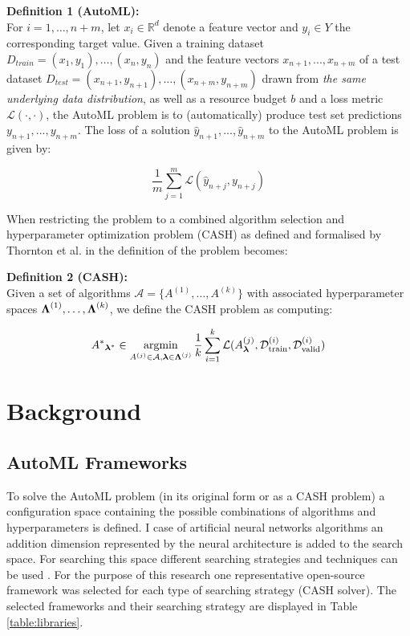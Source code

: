 \documentclass{sig-alternate-br}
\begin{document}
\textbf{Definition 1 (AutoML):} 
\\ For $i = 1, \dots , n + m$, let $x_i \in \mathbb{R}^d$ denote a feature vector and $y_i \in Y$ the corresponding target value. Given a training dataset $D_{train} = {(x_1, y_1),\dots , (x_{n}, y_{n})}$ and
the feature vectors $x_{n+1}, . . . , x_{n+m}$ of a test dataset $D_{test} = {(x_{n+1}, y_{n+1}), \dots ,(x_{n+m}, y_{n+m})}$
drawn from \textit{the same underlying data distribution}, as well as a resource budget $b$ and a loss metric
$\mathcal{L}(\cdot, \cdot)$, the AutoML problem is to (automatically) produce test set predictions $y_{n+1}, . . . , y_{n+m}$. The
loss of a solution $\hat{y}_{n+1}, . . . , \hat{y}_{n+m}$ to the AutoML problem is given by:

\begin{equation}
   \frac{1}{m} \sum_{j=1}^{m} \mathcal{L}( \hat{y}_{n+j},  {y}_{n+j})
\end{equation}

When restricting the problem to a combined algorithm selection and hyperparameter optimization problem (CASH) as defined and formalised by Thornton et al. in \cite{thornton2013autoweka} the definition of the problem becomes:

\textbf{Definition 2 (CASH):}
\\ Given a set of algorithms $\mathcal{A} = \{A^{(1)}, \dots, A^{(k)}\}$ with associated hyperparameter spaces ${\boldsymbol{\Lambda}}^{(1)}, \dots, {\boldsymbol{\Lambda}}^{(k)}$, we define
the CASH problem as computing:

\begin{equation}
{A^*}_{\vlambda^*} \in \argmin_{A^{(j)} \in \mathcal{A}, \vlambda \in \vLambda^{(j)}} \frac{1}{k}  \sum_{i=1}^{k} \mathcal{L}(A^{(j)}_\vlambda, \mathcal{D}_{\text{train}}^{(i)}, \mathcal{D}_{\text{valid}}^{(i)})
\end{equation}

\section{Background}

\subsection{AutoML Frameworks}
To solve the AutoML problem (in its original form or as a CASH problem) a configuration space containing the possible combinations of algorithms and hyperparameters is defined. I case of artificial neural networks algorithms an addition dimension represented by the neural architecture is added to the search space. For searching this space different searching strategies and techniques can be used \cite{truong2019towards}. For the purpose of this research one representative open-source framework \cite{gijsbers2019open} was selected for each type of searching strategy (CASH solver). The selected frameworks and their searching strategy are displayed in Table \ref{table:libraries}.
\end{document}
